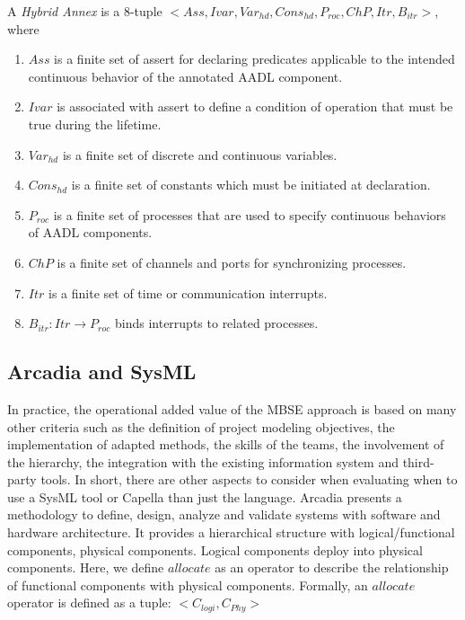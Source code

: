     \label{def:ha}
    A \textit{Hybrid Annex} is a 8-tuple $<Ass, Ivar, Var_{hd}, Cons_{hd}, P_{roc}, ChP, Itr, B_{itr}>$, where 
\begin{enumerate}
    \item $Ass$ is a finite set of assert for declaring predicates applicable to the intended continuous behavior of the annotated AADL component.
    \item $Ivar$ is associated with assert to define a condition of operation that must be true during the lifetime.
    \item $Var_{hd}$ is a finite set of discrete and continuous variables.
    \item $Cons_{hd}$ is a finite set of constants which must be initiated at declaration.
    \item $P_{roc}$ is a finite set of processes that are used to specify continuous behaviors of AADL components.
    \item $ChP$ is a finite set of channels and ports for synchronizing processes. 
    \item $Itr$ is a finite set of time or communication interrupts.
    \item $B_{itr}: Itr \rightarrow P_{roc}$ binds interrupts to related processes.
\end{enumerate} %
     

\subsection{Arcadia and SysML}
In practice, the operational added value of the MBSE approach is based on many other criteria such as the definition of project modeling objectives, the implementation of adapted methods, the skills of the teams, the involvement of the hierarchy, the integration with the existing information system and third-party tools. In short, there are other aspects to consider when evaluating when to use a SysML tool or Capella than just the language.
Arcadia presents a methodology to define, design, analyze and validate systems with software and hardware architecture. It provides a hierarchical structure with logical/functional components, physical components. Logical components deploy into physical components. Here, we define $allocate$ as an operator to describe the relationship of functional components with physical components. Formally, an $allocate$ operator is defined as a tuple: $<C_{logi}, C_{Phy}>$


